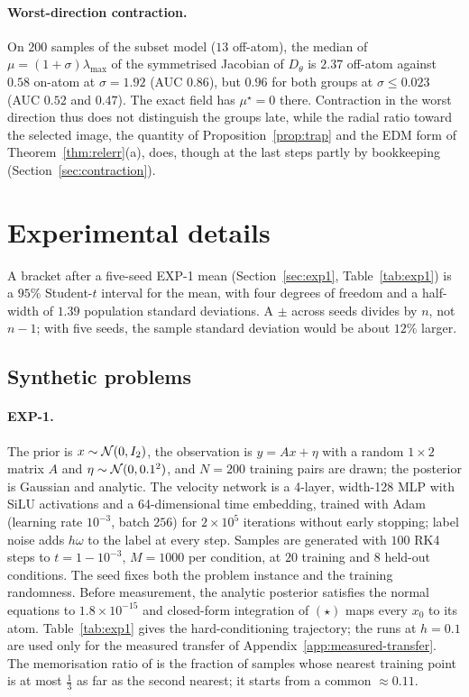 \documentclass{article} %
\theoremstyle{plain}
\theoremstyle{definition}
\theoremstyle{remark}
\begin{document}
\paragraph{Worst-direction contraction.} On $200$ samples of the subset model ($13$ off-atom), the
median of $\mu=(1+\sigma)\lambda_{\max}$ of the symmetrised Jacobian of $D_\theta$ is $2.37$ off-atom
against $0.58$ on-atom at $\sigma=1.92$ (AUC $0.86$), but $0.96$ for both groups at
$\sigma\le0.023$ (AUC $0.52$ and $0.47$). The exact field has $\mu^\star=0$ there. Contraction in the
worst direction thus does not distinguish the groups late, while the radial ratio toward the
selected image, the quantity of Proposition~\ref{prop:trap} and the EDM form of Theorem~\ref{thm:relerr}(a), does, though at the last
steps partly by bookkeeping (Section~\ref{sec:contraction}).


\section{Experimental details}
\label{app:expdetails}

A bracket after a five-seed EXP-1 mean (Section~\ref{sec:exp1}, Table~\ref{tab:exp1}) is a $95\%$ Student-$t$ interval for the mean, with four degrees of freedom
and a half-width of $1.39$ population standard deviations. A $\pm$ across seeds divides by $n$, not $n-1$; with five seeds,
the sample standard deviation would be about $12\%$ larger.

\subsection{Synthetic problems}
\label{app:exp}

\paragraph{EXP-1.} The prior is $x\sim\mathcal{N}(0,I_2)$, the observation is $y=Ax+\eta$ with a random
$1\times2$ matrix $A$ and $\eta\sim\mathcal{N}(0,0.1^2)$, and $N=200$ training pairs are drawn; the
posterior is Gaussian and analytic. The velocity network is a 4-layer, width-128 MLP with SiLU
activations and a 64-dimensional time embedding, trained with Adam (learning rate $10^{-3}$,
batch $256$) for $2\times10^5$ iterations without early stopping; label noise adds
$h\omega$ to the label at every step. Samples are generated with $100$ RK4 steps to
$t=1-10^{-3}$, $M=1000$ per condition, at $20$ training and $8$ held-out conditions. The seed fixes
both the problem instance and the training randomness. Before measurement, the analytic posterior
satisfies the normal equations to $1.8\times10^{-15}$ and closed-form integration of $(\star)$ maps
every $x_0$ to its atom. Table~\ref{tab:exp1} gives the hard-conditioning trajectory; the
runs at $h=0.1$ are used only for the measured transfer of Appendix~\ref{app:measured-transfer}. The memorisation ratio of
\citet{yoon2023memorization} is the fraction of samples whose nearest training point is at most
$\tfrac13$ as far as the second nearest; it starts from a common $\approx0.11$.
\end{document}
